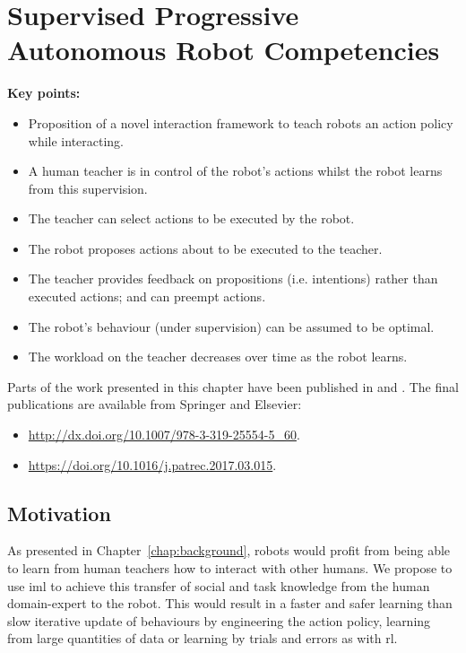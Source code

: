 \chapter{Supervised Progressive Autonomous Robot \newline Competencies}\label{chap:sparc}
\glsresetall
\graphicspath{{images/sparc/}}

\begin{framed}
	\textbf{Key points:}
	\begin{itemize}
		\item Proposition of a novel interaction framework to teach robots an action policy while interacting.
		\item A human teacher is in control of the robot's actions whilst the robot learns from this supervision.
		\item The teacher can select actions to be executed by the robot.
		\item The robot proposes actions about to be executed to the teacher.
		\item The teacher provides feedback on propositions (i.e. intentions) rather than executed actions; and can preempt actions.
		\item The robot's behaviour (under supervision) can be assumed to be optimal.
		\item The workload on the teacher decreases over time as the robot learns.
	\end{itemize}
\end{framed}

Parts of the work presented in this chapter have been published in \cite{senft2015sparc} and \cite{senft2017supervised}. The final publications are available from Springer and Elsevier:
\begin{itemize}
	\item \url{http://dx.doi.org/10.1007/978-3-319-25554-5_60}.
	\item \url{https://doi.org/10.1016/j.patrec.2017.03.015}.
\end{itemize}

\newpage
\section{Motivation}
As presented in Chapter~\ref{chap:background}, robots would profit from being able to learn from human teachers how to interact with other humans. We propose to use \gls{iml} to achieve this transfer of social and task knowledge from the human domain-expert to the robot. This would result in a faster and safer learning than slow iterative update of behaviours by engineering the action policy, learning from large quantities of data or learning by trials and errors as with \gls{rl}.


